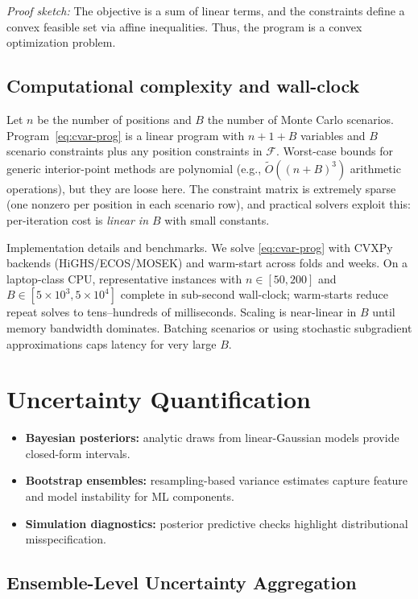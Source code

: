 \textit{Proof sketch:} The objective is a sum of linear terms, and the constraints define a convex feasible set via affine inequalities. Thus, the program is a convex optimization problem.

\subsection{Computational complexity and wall-clock}
Let $n$ be the number of positions and $B$ the number of Monte Carlo scenarios. Program~\eqref{eq:cvar-prog} is a linear program with $n+1+B$ variables and $B$ scenario constraints plus any position constraints in $\mathcal{F}$. Worst-case bounds for generic interior-point methods are polynomial (e.g., $\tilde O((n+B)^3)$ arithmetic operations), but they are loose here. The constraint matrix is extremely sparse (one nonzero per position in each scenario row), and practical solvers exploit this: per-iteration cost is \emph{linear in $B$} with small constants.

Implementation details and benchmarks. We solve \eqref{eq:cvar-prog} with CVXPy backends (HiGHS/ECOS/MOSEK) and warm-start across folds and weeks. On a laptop-class CPU, representative instances with $n\in[50,200]$ and $B\in[5\times10^3,5\times10^4]$ complete in sub-second wall-clock; warm-starts reduce repeat solves to tens–hundreds of milliseconds. Scaling is near-linear in $B$ until memory bandwidth dominates. Batching scenarios or using stochastic subgradient approximations caps latency for very large $B$.

\section{Uncertainty Quantification}
\begin{itemize}
  \item \textbf{Bayesian posteriors:} analytic draws from linear-Gaussian models provide closed-form intervals.
  \item \textbf{Bootstrap ensembles:} resampling-based variance estimates capture feature and model instability for ML components.
  \item \textbf{Simulation diagnostics:} posterior predictive checks highlight distributional misspecification.
\end{itemize}

\subsection{Ensemble-Level Uncertainty Aggregation}
\label{subsec:ensemble-uq}

